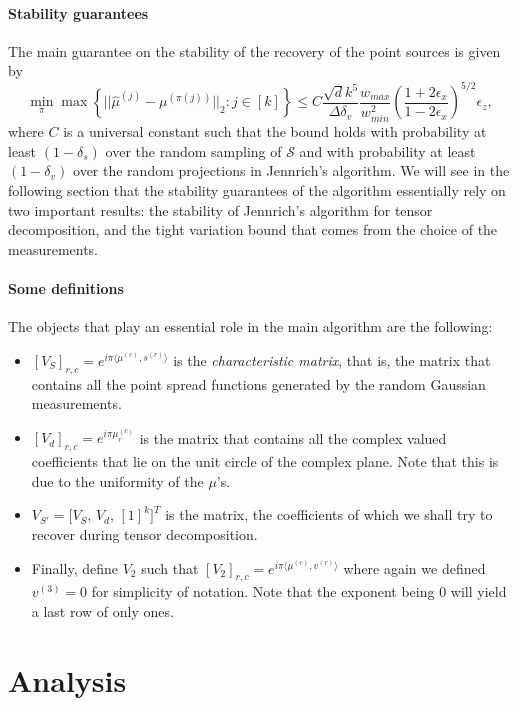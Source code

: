 \paragraph{Stability guarantees} The main guarantee on the stability of the recovery of the point sources is given by $$\min_\pi\max\left\{||\widehat{\mu}^{(j)}-\mu^{(\pi(j))}||_2:j\in[k]\right\}\leq C\frac{\sqrt{d}k^5}{\Delta\delta_v}\frac{w_{max}}{w_{min}^2}\left(\frac{1+2\epsilon_x}{1-2\epsilon_x}\right)^{5/2}\epsilon_z,$$ where $C$ is a universal constant such that the bound holds with probability at least $(1-\delta_s)$ over the random sampling of $\mathcal{S}$ and with probability at least $(1-\delta_v)$ over the random projections in Jennrich's algorithm. We will see in the following section that the stability guarantees of the algorithm essentially rely on two important results: the stability of Jennrich's algorithm for tensor decomposition, and the tight variation bound that comes from the choice of the measurements.
\paragraph{Some definitions}
The objects that play an essential role in the main algorithm are the following:
\begin{itemize}
    \item $[V_S]_{r,c}=e^{i\pi\langle\mu^{(c)},s^{(r)}\rangle}$ is the \textit{characteristic matrix}, that is, the matrix that contains all the point spread functions generated by the random Gaussian measurements.
    \item $[V_d]_{r,c}=e^{i\pi\mu_r^{(c)}}$ is the matrix that contains all the complex valued coefficients that lie on the unit circle of the complex plane. Note that this is due to the uniformity of the $\mu$'s.
    \item $V_{S'}=\big[V_S,\, V_d,\, [1]^k\big]^T$ is the matrix, the coefficients of which we shall try to recover during tensor decomposition.
    \item Finally, define $V_2$ such that $[V_2]_{r,c}=e^{i\pi\langle\mu^{(c)},v^{(r)}\rangle}$ where again we defined $v^{(3)}=0$ for simplicity of notation. Note that the exponent being 0 will yield a last row of only ones.
\end{itemize}
\section{Analysis}
